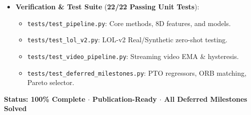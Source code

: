 \documentclass[10pt,a4paper]{article}
\begin{document}
\begin{itemize}[leftmargin=*]
\begin{itemize}
        \item \texttt{report/Project\_Triathlon\_Step\_by\_Step\_Walkthrough.docx}: Technical walkthrough.
    \end{itemize}
    \item \textbf{Verification \& Test Suite} (\textbf{22/22 Passing Unit Tests}):
    \begin{itemize}
        \item \texttt{tests/test\_pipeline.py}: Core methods, 8D features, and models.
        \item \texttt{tests/test\_lol\_v2.py}: LOL-v2 Real/Synthetic zero-shot testing.
        \item \texttt{tests/test\_video\_pipeline.py}: Streaming video EMA \& hysteresis.
        \item \texttt{tests/test\_deferred\_milestones.py}: PTO regressors, ORB matching, Pareto selector.
    \end{itemize}
\end{itemize}

\vspace{0.8cm}
\begin{tcolorbox}[colback=badgegreen,colframe=successgreen,arc=2mm]
\centering \bfseries \color{successgreen}
Status: 100\% Complete $\cdot$ Publication-Ready $\cdot$ All Deferred Milestones Solved
\end{tcolorbox}
\end{document}
